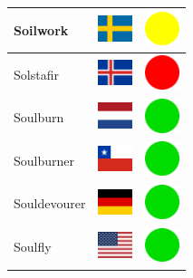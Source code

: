 \documentclass[12pt, a4paper, twoside]{report}
\begin{document}
\begin{center}
\begin{longtable}{|p{5cm}|p{2cm}|p{2cm}|}
 Soilwork                                                   & \includegraphics[width=1cm]{../img/flags/se} &   \includegraphics[width=1cm]{../likes/m} \\ \hline
 Solstafir                                                  & \includegraphics[width=1cm]{../img/flags/is} &   \includegraphics[width=1cm]{../likes/n} \\ \hline
 Soulburn                                                   & \includegraphics[width=1cm]{../img/flags/nl} &   \includegraphics[width=1cm]{../likes/y} \\ \hline
 Soulburner                                                 & \includegraphics[width=1cm]{../img/flags/cl} &   \includegraphics[width=1cm]{../likes/y} \\ \hline
 Souldevourer                                               & \includegraphics[width=1cm]{../img/flags/de} &   \includegraphics[width=1cm]{../likes/y} \\ \hline
 Soulfly                                                    & \includegraphics[width=1cm]{../img/flags/us} &   \includegraphics[width=1cm]{../likes/y} \\ \hline

\end{longtable}
\end{center}
\end{document}
